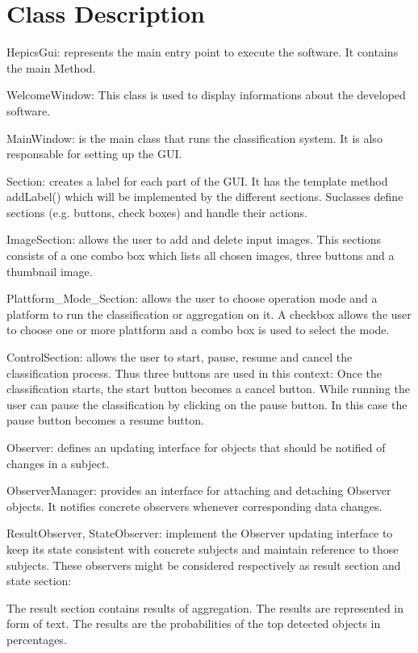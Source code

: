 \documentclass[parskip=full]{scrartcl}
\begin{document}
\pagebreak

\section {Class Description}

HepicsGui: represents the main entry point to execute the software. It contains the main Method.

WelcomeWindow: This class is used to display informations about the developed software.

MainWindow: is the main class that runs the classification system. It is also responsable for setting up the GUI.

Section: creates a label for each part of the GUI. It has the template method addLabel() which will be implemented by the different sections. Suclasses define sections (e.g. buttons, check boxes) and handle their actions.

ImageSection: allows the user to add and delete input images. This sections consists of a one combo box which lists all chosen images, three buttons and a thumbnail image.

Plattform\_Mode\_Section: allows the user to choose operation mode and a platform to run the classification or aggregation on it. A checkbox allows the user to choose one or more plattform and a combo box is used to select the mode.

ControlSection: allows the user to start, pause, resume and cancel the classification process. Thus three buttons are used in this context: Once the classification starts, the start button becomes a cancel button. While running the user can pause the classification by clicking on the pause button. In this case the pause button becomes a resume button.

Observer: defines an updating interface for objects that should be notified of changes in a subject.

ObserverManager: provides an interface for attaching and detaching Observer objects. It notifies concrete observers whenever corresponding data changes.

ResultObserver, StateObserver: implement the Observer updating interface to keep its state consistent with concrete subjects and maintain reference to those subjects. These observers might be considered respectively as result section and state section:

  The result section contains results of aggregation. The results are represented in form of text. The results are the probabilities of   the top detected objects in percentages.
  
\end{document}
